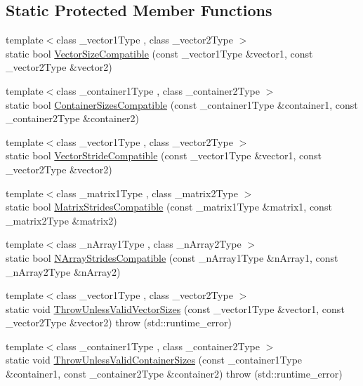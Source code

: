 \subsection*{Static Protected Member Functions}
{\bf }\par
\begin{DoxyCompactItemize}
\item 
{\footnotesize template$<$class \-\_\-vector1\-Type , class \-\_\-vector2\-Type $>$ }\\static bool \hyperlink{classvct_fast_copy_ab2c9114578e85d404e254ad58f761ed4}{Vector\-Size\-Compatible} (const \-\_\-vector1\-Type \&vector1, const \-\_\-vector2\-Type \&vector2)
\item 
{\footnotesize template$<$class \-\_\-container1\-Type , class \-\_\-container2\-Type $>$ }\\static bool \hyperlink{classvct_fast_copy_a7c5a056603df9a993d4bde635cb61a62}{Container\-Sizes\-Compatible} (const \-\_\-container1\-Type \&container1, const \-\_\-container2\-Type \&container2)
\item 
{\footnotesize template$<$class \-\_\-vector1\-Type , class \-\_\-vector2\-Type $>$ }\\static bool \hyperlink{classvct_fast_copy_aa64fac5d83c9184800bb4df1cf30b052}{Vector\-Stride\-Compatible} (const \-\_\-vector1\-Type \&vector1, const \-\_\-vector2\-Type \&vector2)
\item 
{\footnotesize template$<$class \-\_\-matrix1\-Type , class \-\_\-matrix2\-Type $>$ }\\static bool \hyperlink{classvct_fast_copy_af8b135cabbe52d3b16129dbbf224cf41}{Matrix\-Strides\-Compatible} (const \-\_\-matrix1\-Type \&matrix1, const \-\_\-matrix2\-Type \&matrix2)
\item 
{\footnotesize template$<$class \-\_\-n\-Array1\-Type , class \-\_\-n\-Array2\-Type $>$ }\\static bool \hyperlink{classvct_fast_copy_a9e3d20628a36e889a1a6224983d79e5b}{N\-Array\-Strides\-Compatible} (const \-\_\-n\-Array1\-Type \&n\-Array1, const \-\_\-n\-Array2\-Type \&n\-Array2)
\end{DoxyCompactItemize}

{\bf }\par
\begin{DoxyCompactItemize}
\item 
{\footnotesize template$<$class \-\_\-vector1\-Type , class \-\_\-vector2\-Type $>$ }\\static void \hyperlink{classvct_fast_copy_a55fd7b6ee74b14fa20f5ca29c4917806}{Throw\-Unless\-Valid\-Vector\-Sizes} (const \-\_\-vector1\-Type \&vector1, const \-\_\-vector2\-Type \&vector2)  throw (std\-::runtime\-\_\-error)
\item 
{\footnotesize template$<$class \-\_\-container1\-Type , class \-\_\-container2\-Type $>$ }\\static void \hyperlink{classvct_fast_copy_a20bd38c200a02319129f4514c9b74174}{Throw\-Unless\-Valid\-Container\-Sizes} (const \-\_\-container1\-Type \&container1, const \-\_\-container2\-Type \&container2)  throw (std\-::runtime\-\_\-error)
\end{DoxyCompactItemize}



